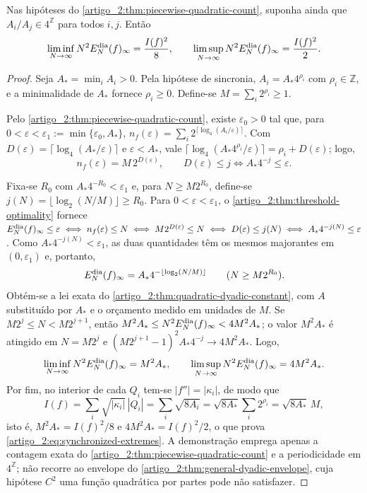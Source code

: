 \begin{corollary}\label{map:artigo_2:12.3}
\label{artigo_2:cor:synchronized-phases}
Nas hipóteses do \cref{artigo_2:thm:piecewise-quadratic-count}, suponha ainda que
$A_i/A_j\in4^{\mathbb Z}$ para todos $i,j$. Então
\begin{equation}
 \liminf_{N\to\infty}N^2E_N^{\rm dia}(f)_\infty=\frac{I(f)^2}{8},
 \qquad
 \limsup_{N\to\infty}N^2E_N^{\rm dia}(f)_\infty=\frac{I(f)^2}{2}.
 \label{artigo_2:eq:synchronized-extremes}
\end{equation}
\end{corollary}

\begin{proof}
Seja $A_\ast=\min_iA_i>0$. Pela hipótese de sincronia, $A_i=A_\ast4^{\rho_i}$ com
$\rho_i\in\mathbb Z$, e a minimalidade de $A_\ast$ fornece $\rho_i\ge0$. Define-se
$M=\sum_i2^{\rho_i}\ge1$.

Pelo \cref{artigo_2:thm:piecewise-quadratic-count}, existe $\varepsilon_0>0$ tal que,
para $0<\varepsilon<\varepsilon_1:=\min\{\varepsilon_0,A_\ast\}$,
$n_f(\varepsilon)=\sum_i2^{\lceil\log_4(A_i/\varepsilon)\rceil}$. Com
$D(\varepsilon)=\lceil\log_4(A_\ast/\varepsilon)\rceil$ e $\varepsilon<A_\ast$, vale
$\lceil\log_4(A_\ast4^{\rho_i}/\varepsilon)\rceil=\rho_i+D(\varepsilon)$; logo,
\[
 n_f(\varepsilon)=M\,2^{D(\varepsilon)},
 \qquad
 D(\varepsilon)\le j\iff A_\ast4^{-j}\le\varepsilon .
\]

Fixa-se $R_0$ com $A_\ast4^{-R_0}<\varepsilon_1$ e, para $N\ge M2^{R_0}$, define-se
$j(N)=\lfloor\log_2(N/M)\rfloor\ge R_0$. Para $0<\varepsilon<\varepsilon_1$, o
\cref{artigo_2:thm:threshold-optimality} fornece
$E_N^{\rm dia}(f)_\infty\le\varepsilon\iff n_f(\varepsilon)\le N\iff
M2^{D(\varepsilon)}\le N\iff D(\varepsilon)\le j(N)\iff A_\ast4^{-j(N)}\le\varepsilon$.
Como $A_\ast4^{-j(N)}<\varepsilon_1$, as duas quantidades têm os mesmos majorantes
em $(0,\varepsilon_1)$ e, portanto,
\[
 E_N^{\rm dia}(f)_\infty=A_\ast4^{-\lfloor\log_2(N/M)\rfloor}
 \qquad(N\ge M2^{R_0}).
\]
Obtém-se a lei exata do \cref{artigo_2:thm:quadratic-dyadic-constant}, com $A$ substituído
por $A_\ast$ e o orçamento medido em unidades de $M$. Se
$M2^j\le N<M2^{j+1}$, então $M^2A_\ast\le N^2E_N^{\rm dia}(f)_\infty<4M^2A_\ast$;
o valor $M^2A_\ast$ é atingido em $N=M2^j$ e
$(M2^{j+1}-1)^2A_\ast4^{-j}\to4M^2A_\ast$. Logo,
\[
 \liminf_{N\to\infty}N^2E_N^{\rm dia}(f)_\infty=M^2A_\ast,
 \qquad
 \limsup_{N\to\infty}N^2E_N^{\rm dia}(f)_\infty=4M^2A_\ast .
\]
Por fim, no interior de cada $Q_i$ tem-se $|f''|=|\kappa_i|$, de modo que
\[
 I(f)=\sum_i\sqrt{|\kappa_i|}\,|Q_i|=\sum_i\sqrt{8A_i}
 =\sqrt{8A_\ast}\sum_i2^{\rho_i}=\sqrt{8A_\ast}\,M,
\]
isto é, $M^2A_\ast=I(f)^2/8$ e $4M^2A_\ast=I(f)^2/2$, o que prova
\eqref{artigo_2:eq:synchronized-extremes}. A demonstração emprega apenas a contagem
exata do \cref{artigo_2:thm:piecewise-quadratic-count} e a periodicidade em
$4^{\mathbb Z}$; não recorre ao envelope do
\cref{artigo_2:thm:general-dyadic-envelope}, cuja hipótese $C^2$ uma função quadrática por
partes pode não satisfazer.
\end{proof}

